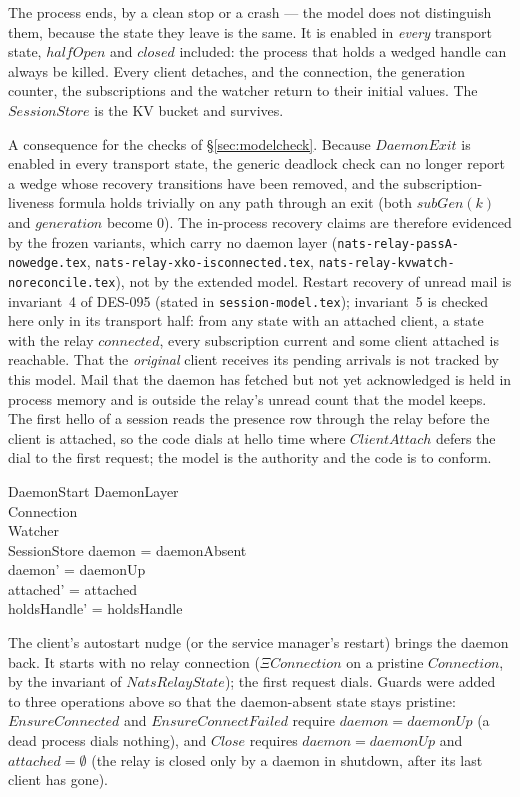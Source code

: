 \documentclass[a4paper,10pt,fleqn]{article}
\begin{document}
The process ends, by a clean stop or a crash --- the model does not
distinguish them, because the state they leave is the same.  It is
enabled in \emph{every} transport state, $halfOpen$ and $closed$
included: the process that holds a wedged handle can always be killed.
Every client detaches, and the connection, the generation counter, the
subscriptions and the watcher return to their initial values.  The
$SessionStore$ is the KV bucket and survives.

A consequence for the checks of \S\ref{sec:modelcheck}.  Because $DaemonExit$
is enabled in every transport state, the generic deadlock check can no longer
report a wedge whose recovery transitions have been removed, and the
subscription-liveness formula holds trivially on any path through an exit
(both $subGen(k)$ and $generation$ become $0$).  The in-process recovery
claims are therefore evidenced by the frozen variants, which carry no daemon
layer (\texttt{nats-relay-passA-nowedge.tex},
\texttt{nats-relay-xko-isconnected.tex},
\texttt{nats-relay-kvwatch-noreconcile.tex}), not by the extended model.
Restart recovery of unread mail is invariant~4 of DES-095 (stated in
\texttt{session-model.tex}); invariant~5 is checked here only in its transport half: from any state with an
attached client, a state with the relay $connected$, every subscription current and
some client attached is reachable.  That the \emph{original} client receives its
pending arrivals is not tracked by this model.  Mail that
the daemon has fetched but not yet acknowledged is held in process memory and
is outside the relay's unread count that the model keeps.  The first hello of a
session reads the presence row through the relay before the client is
attached, so the code dials at hello time where $ClientAttach$ defers the dial
to the first request; the model is the authority and the code is to conform.

\begin{schema}{DaemonStart}
  \Delta DaemonLayer \\
  \Xi Connection \\
  \Xi Watcher \\
  \Xi SessionStore
  \where
  daemon = daemonAbsent \\
  daemon' = daemonUp \\
  attached' = attached \\
  holdsHandle' = holdsHandle
\end{schema}

The client's autostart nudge (or the service manager's restart) brings the
daemon back.  It starts with no relay connection ($\Xi Connection$ on a
pristine $Connection$, by the invariant of $NatsRelayState$); the first
request dials.  Guards were added to three operations above so that the
daemon-absent state stays pristine: $EnsureConnected$ and
$EnsureConnectFailed$ require $daemon = daemonUp$ (a dead process dials
nothing), and $Close$ requires $daemon = daemonUp$ and $attached =
\emptyset$ (the relay is closed only by a daemon in shutdown, after its
last client has gone).
\end{document}

